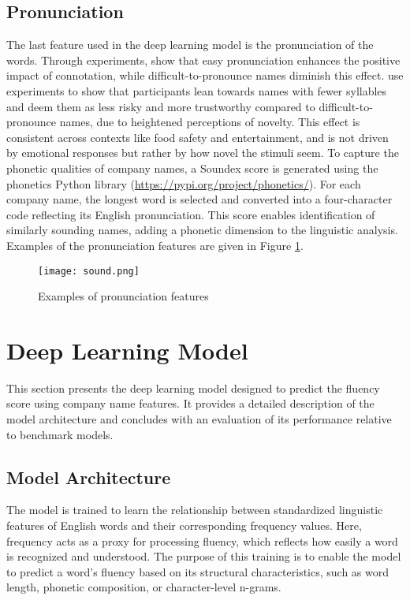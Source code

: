 \documentclass[a4paper,11pt]{report}
\begin{document}
\subsection{Pronunciation}
The last feature used in the deep learning model is the pronunciation of the words. Through experiments,  show that easy pronunciation enhances the positive impact of connotation, while difficult-to-pronounce names diminish this effect.  use experiments to show that participants lean towards names with fewer syllables and deem them as less risky and more trustworthy compared to difficult-to-pronounce names, due to heightened perceptions of novelty. This effect is consistent across contexts like food safety and entertainment, and is not driven by emotional responses but rather by how novel the stimuli seem. To capture the phonetic qualities of company names, a Soundex score is generated using the phonetics Python library (\url{https://pypi.org/project/phonetics/}). For each company name, the longest word is selected and converted into a four-character code reflecting its English pronunciation. This score enables identification of similarly sounding names, adding a phonetic dimension to the linguistic analysis. Examples of the pronunciation features are given in Figure \ref{fig:sound_name}.

\begin{figure}[h!]
    \centering
    \texttt{[image: sound.png]}
    \caption{Examples of pronunciation features}
    \label{fig:sound_name}
\end{figure}



\section{Deep Learning Model} \label{deep_learning_model}
This section presents the deep learning model designed to predict the fluency score using company name features. It provides a detailed description of the model architecture and concludes with an evaluation of its performance relative to benchmark models.

\subsection{Model Architecture}
The model is trained to learn the relationship between standardized linguistic features of English words and their corresponding frequency values. Here, frequency acts as a proxy for processing fluency, which reflects how easily a word is recognized and understood. The purpose of this training is to enable the model to predict a word’s fluency based on its structural characteristics, such as word length, phonetic composition, or character-level n-grams.
\end{document}
